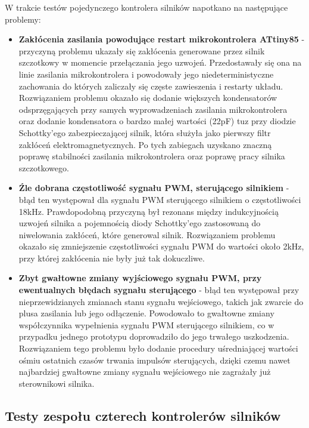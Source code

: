 W trakcie testów pojedynczego kontrolera silników napotkano na następujące problemy:
\begin{itemize}
	\item \textbf{Zakłócenia zasilania powodujące restart mikrokontrolera ATtiny85} - przyczyną problemu ukazały się zakłócenia generowane przez silnik szczotkowy w momencie przełączania jego uzwojeń. Przedostawały się ona na linie zasilania mikrokontrolera i powodowały jego niedeterministyczne zachowania do których zaliczały się częste zawieszenia i restarty układu. Rozwiązaniem problemu okazało się dodanie większych kondensatorów odsprzęgających przy samych wyprowadzeniach zasilania mikrokontrolera oraz dodanie kondensatora o bardzo małej wartości (22pF) tuz przy diodzie Schottky'ego zabezpieczającej silnik, która służyła jako pierwszy filtr zakłóceń elektromagnetycznych. Po tych zabiegach uzyskano znaczną poprawę stabilności zasilania mikrokontrolera oraz poprawę pracy silnika szczotkowego.
	\item \textbf{Źle dobrana częstotliwość sygnału PWM, sterującego silnikiem} - błąd ten występował dla sygnału PWM sterującego silnikiem o częstotliwości 18kHz. Prawdopodobną przyczyną był rezonans między indukcyjnością uzwojeń silnika a pojemnością diody Schottky'ego zastosowaną do niwelowania zakłóceń, które generowal silnik. Rozwiązaniem problemu okazało się zmniejszenie częstotliwości sygnału PWM do wartości około 2kHz, przy której zakłócenia nie były już tak dokuczliwe.
	\item \textbf{Zbyt gwałtowne zmiany wyjściowego sygnału PWM, przy ewentualnych błędach sygnału sterującego} - błąd ten występował przy nieprzewidzianych zmianach stanu sygnału wejściowego, takich jak zwarcie do plusa zasilania lub jego odłączenie. Powodowało to gwałtowne zmiany współczynnika wypełnienia sygnału PWM sterującego silnikiem, co w przypadku jednego prototypu doprowadziło do jego trwałego uszkodzenia. Rozwiązaniem tego problemu było dodanie procedury uśredniającej wartości ośmiu ostatnich czasów trwania impulsów sterujących, dzięki czemu nawet najbardziej gwałtowne zmiany sygnału wejściowego nie zagrażały już sterownikowi silnika.
\end{itemize}

\subsection{Testy zespołu czterech kontrolerów silników}


